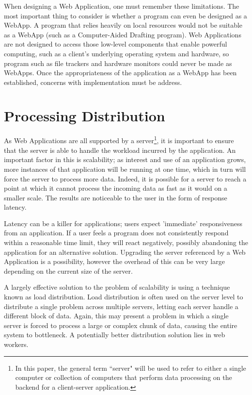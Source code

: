 \documentclass{acmsmall}
\begin{document}
When designing a Web Application, one must remember these limitations.  The most important thing to consider is whether a program can even be designed as a WebApp.  A program that relies heavily on local resources would not be suitable as a WebApp (such as a Computer-Aided Drafting program).  Web Applications are not designed to access those low-level components that enable powerful computing, such as a client's underlying operating system and hardware, so program such as file trackers and hardware monitors could never be made as WebApps.  Once the appropriateness of the application as a WebApp has been established, concerns with implementation must be address.

\section{Processing Distribution}
\label{sec:loaddist}

As Web Applications are all supported by a server\footnote{In this paper, the general term ``server" will be used to refer to either a single computer or collection of computers that perform data processing on the backend for a client-server application.}, it is important to ensure that the server is able to handle the workload incurred by the application.  An important factor in this is scalability; as interest and use of an application grows, more instances of that application will be running at one time, which in turn will force the server to process more data.  Indeed, it is possible for a server to reach a point at which it cannot process the incoming data as fast as it would on a smaller scale.  The results are noticeable to the user in the form of response latency.

Latency can be a killer for applications; users expect 'immediate' responsiveness from an application.  If a user feels a program does not consistently respond within a reasonable time limit, they will react negatively, possibly abandoning the application for an alternative solution.\cite{wwwdelay}  Upgrading the server referenced by a Web Application is a possibility, however the overhead of this can be very large depending on the current size of the server.

A largely effective solution to the problem of scalability is using a technique known as load distribution.  Load distribution is often used on the server level to distribute a single problem across multiple servers, letting each server handle a different block of data.  Again, this may present a problem in which a single server is forced to process a large or complex chunk of data, causing the entire system to bottleneck.  A potentially better distribution solution lies in web workers.
\end{document}
